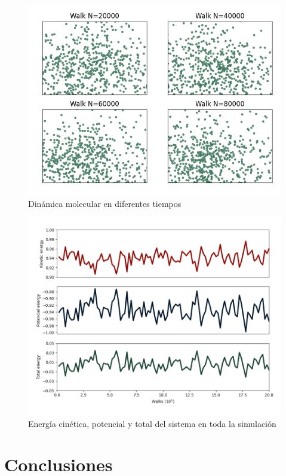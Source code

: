\documentclass[12pt,letterpaper]{article}
\begin{document}
\begin{multicols}{2}
\begin{figure}[H]
    \centering
    \includegraphics[scale=0.45]{../Graphics/Dim_Graphics.png}
    \caption{Dinámica molecular en diferentes tiempos}
    \label{screen dinamica}
\end{figure}
\begin{figure}[H]
    \centering
    \includegraphics[scale=0.335]{../Graphics/Energy.png}
    \caption{Energía cinética, potencial y total del sistema en toda la simulación}
    \label{energias}
\end{figure}
\section*{Conclusiones}

\end{multicols}
\end{document}
